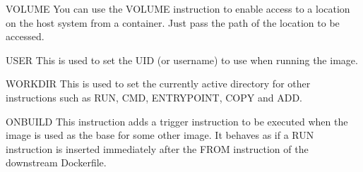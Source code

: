 \documentclass{beamer}
\begin{document}
\begin{frame}
\small
\begin{block}{VOLUME}
You can use the VOLUME instruction to enable access to a location on the host system from a container. Just pass the path of the location to be accessed.
\end{block}

\begin{block}{USER}
This is used to set the UID (or username) to use when running the image.
\end{block}
\begin{block}{WORKDIR}
This is used to set the currently active directory for other instructions such as RUN, CMD, ENTRYPOINT, COPY and ADD.
\end{block}

\begin{block}{ONBUILD}
This instruction adds a trigger instruction to be executed when the image is used as the base for some other image. It behaves as if a RUN instruction is inserted immediately after the FROM instruction of the downstream Dockerfile.
\end{block}

\end{frame}

\end{document}

